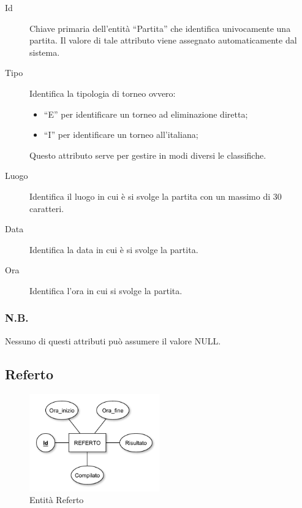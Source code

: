 		\begin{description}
			
			\item[Id]
			Chiave primaria dell'entità ``Partita'' che identifica univocamente una partita. Il valore di tale attributo viene assegnato automaticamente dal sistema.
			
			\item[Tipo]
			Identifica la tipologia di torneo ovvero:
			\begin{itemize}
				\item
				``E'' per identificare un torneo ad eliminazione diretta;
				\item
				``I'' per identificare un torneo all'italiana;
			\end{itemize}
			Questo attributo serve per gestire in modi diversi le classifiche.
			
			\item[Luogo]
			Identifica il luogo in cui è si svolge la partita con un massimo di 30 caratteri.
			
			\item[Data]
			Identifica la data in cui è si svolge la partita.
			
			\item[Ora]
			Identifica l'ora in cui si svolge la partita.
			
		\end{description}
		
		\subsubsection*{N.B.}
		Nessuno di questi attributi può assumere il valore NULL.
	
	\subsection{Referto}
		
		\begin{figure}[h]
			\centering
			\includegraphics[width=0.5\textwidth]
			{immagini/08-referto}
			
			\caption{Entità Referto}
			\label{entita-referto}
		\end{figure}
		
